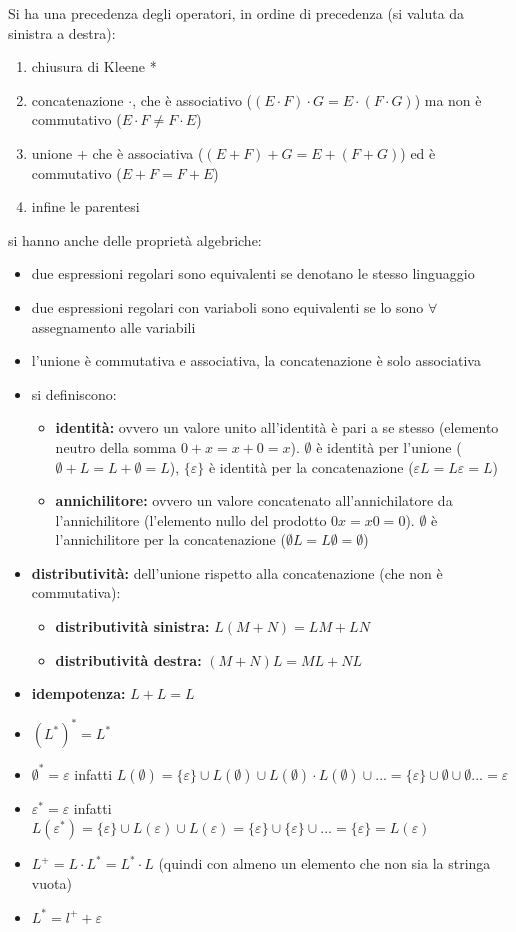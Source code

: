 Si ha una precedenza degli operatori, in ordine di precedenza (si valuta da sinistra a destra):
\begin{enumerate}
	\item chiusura di Kleene *
	\item concatenazione $\cdot$, che è associativo ($(E\cdot F)\cdot G=E\cdot (F\cdot G)$) ma non è commutativo ($E\cdot F\neq F\cdot E$)
	\item unione + che è associativa ($(E+ F)+ G=E+ (F+ G)$) ed è commutativo ($E+F= F+ E$)
	\item infine le parentesi
\end{enumerate}
si hanno anche delle proprietà algebriche:
\begin{itemize}
	\item due espressioni regolari sono equivalenti se denotano le stesso linguaggio
	\item due espressioni regolari con variaboli sono equivalenti se lo sono $\forall$ assegnamento alle variabili
	\item l'unione è commutativa e associativa, la concatenazione è solo associativa
	\item si definiscono:
				\begin{itemize}
					\item \textbf{identità:} ovvero un valore unito all'identità è pari a se stesso (elemento neutro della somma $0+x=x+0=x$). $\emptyset$ è identità per l'unione ($\emptyset+L=L+\emptyset=L$), $\{\varepsilon\}$ è identità per la concatenazione ($\varepsilon L=L\varepsilon=L$)
					\item \textbf{annichilitore:} ovvero un valore concatenato all'annichilatore da l'annichilitore (l'elemento nullo del prodotto $0x=x0=0$).  $\emptyset$ è l'annichilitore per la concatenazione ($\emptyset L=L\emptyset=\emptyset$)
				\end{itemize}
	\item \textbf{distributività:} dell'unione rispetto alla concatenazione (che non è commutativa):
				\begin{itemize}
					\item \textbf{distributività sinistra:} $L(M+N)=LM+LN$
					\item \textbf{distributività destra:} $(M+N)L=ML+NL$
				\end{itemize}
	\item \textbf{idempotenza:} $L+L=L$
	\item $(L^*)^*=L^*$
	\item $\emptyset^*=\varepsilon$ infatti $L(\emptyset)=\{\varepsilon\}\cup L(\emptyset)\cup L(\emptyset)\cdot L(\emptyset)\cup...=\{\varepsilon\}\cup \emptyset\cup \emptyset...=\varepsilon$
	\item $\varepsilon^*=\varepsilon$ infatti $L(\varepsilon^*)=\{\varepsilon\}\cup L(\varepsilon)\cup L(\varepsilon)=\{\varepsilon\}\cup \{\varepsilon\}\cup ...=\{\varepsilon\}=L(\varepsilon)$
	\item $L^+=L\cdot L^*=L^*\cdot L$ (quindi con almeno un elemento che non sia la stringa vuota)
	\item $L^*=l^++\varepsilon$
\end{itemize}
